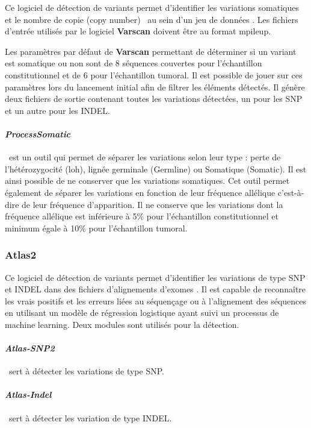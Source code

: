 Ce logiciel de détection de variants permet d'identifier les variations somatiques et le nombre de copie (\og \gls{copy number}\fg) ~au sein d'un jeu de données \citep{Varscan}. Les fichiers d'entrée utilisés par le logiciel \textbf{Varscan} doivent être au format mpileup.

Les paramètres par défaut de \textbf{Varscan} permettant de déterminer si un variant est somatique ou non sont de 8 séquences couvertes pour l'échantillon constitutionnel et de 6 pour l'échantillon tumoral. Il est possible de jouer sur ces paramètres lors du lancement initial afin de filtrer les éléments détectés. Il génère deux fichiers de sortie contenant toutes les variations détectées, un pour les SNP et un autre pour les INDEL. 

\paragraph*{\textit{ProcessSomatic}} ~est un outil qui permet de séparer les variations selon leur type : perte de l'hétérozygocité (\acrshort{loh}), lignée germinale (Germline) ou Somatique (Somatic). Il est ainsi possible de ne conserver que les variations somatiques. Cet outil permet également de séparer les variations en fonction de leur fréquence allélique c'est-à-dire de leur fréquence d'apparition. Il ne conserve que les variations dont la fréquence allélique est inférieure à 5\% pour l'échantillon constitutionnel et minimum égale à 10\% pour l'échantillon tumoral. 

\subsubsection{Atlas2}\label{Atlas}

Ce logiciel de détection de variants permet d'identifier les variations de type SNP et INDEL dans des fichiers d'alignements d'exomes \citep{Atlas}. Il est capable de reconnaître les vrais positifs et les erreurs liées au séquençage ou à l'alignement des séquences en utilisant un modèle de régression logistique ayant suivi un processus de \og \gls{machine learning}\fg. Deux modules sont utilisés pour la détection.

\paragraph{\textit{Atlas-SNP2}} ~sert à détecter les variations de type SNP.
\paragraph{\textit{Atlas-Indel}} ~sert à détecter les variation de type INDEL. 

